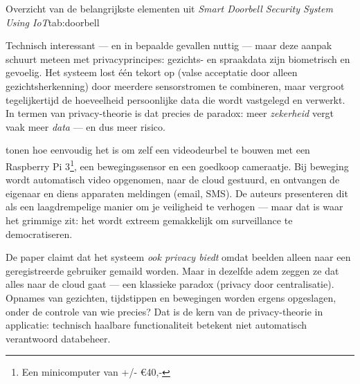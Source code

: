 \documentclass[nonacm, sigconf]{acmart}
\begin{document}
    \begin{SimpleTable}[s{0.5}s{1.5}]{Overzicht van de belangrijkste elementen uit \textit{Smart Doorbell Security System Using IoT}}{tab:doorbell}
    \end{SimpleTable}

    \noindent
    Technisch interessant — en in bepaalde gevallen nuttig — maar deze aanpak schuurt meteen met privacyprincipes: gezichts- en spraakdata zijn biometrisch en gevoelig. Het systeem lost één tekort op (valse acceptatie door alleen gezichtsherkenning) door meerdere sensorstromen te combineren, maar vergroot tegelijkertijd de hoeveelheid persoonlijke data die wordt vastgelegd en verwerkt. In termen van privacy-theorie is dat precies de paradox: meer \emph{zekerheid} vergt vaak meer \emph{data} — en dus meer risico.

    \bigskip


    \parencite{lalitha2019smart} tonen hoe eenvoudig het is om zelf een videodeurbel te bouwen met een Raspberry Pi 3\footnote{Een minicomputer van +/- €40,-}, een bewegingssensor en een goedkoop cameraatje. Bij beweging wordt automatisch video opgenomen, naar de cloud gestuurd, en ontvangen de eigenaar en diens apparaten meldingen (email, SMS). De auteurs presenteren dit als een laagdrempelige manier om je veiligheid te verhogen — maar dat is waar het grimmige zit: het wordt extreem gemakkelijk om surveillance te democratiseren.

    \noindent
    De paper claimt dat het systeem \emph{ook privacy biedt} omdat beelden alleen naar een geregistreerde gebruiker gemaild worden. Maar in dezelfde adem zeggen ze dat alles naar de cloud gaat — een klassieke paradox (privacy door centralisatie). Opnames van gezichten, tijdstippen en bewegingen worden ergens opgeslagen, onder de controle van wie precies? Dat is de kern van de privacy-theorie in applicatie: technisch haalbare functionaliteit betekent niet automatisch verantwoord databeheer.
\end{document}
